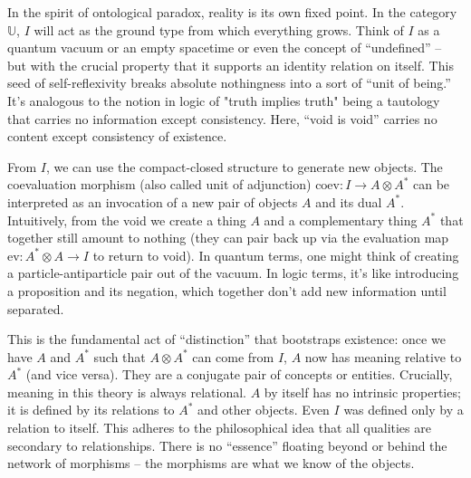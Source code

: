\documentclass{article}
\begin{document}
In the spirit of ontological paradox, reality is its own fixed point. In the category $\mathbb{U}$, $I$ will act as the ground type from which everything grows. Think of $I$ as a quantum vacuum or an empty spacetime or even the concept of “undefined” – but with the crucial property that it supports an identity relation on itself. This seed of self-reflexivity breaks absolute nothingness into a sort of “unit of being.” It’s analogous to the notion in logic of "truth implies truth" being a tautology that carries no information except consistency. Here, “void is void” carries no content except consistency of existence.

From $I$, we can use the compact-closed structure to generate new objects. The coevaluation morphism (also called unit of adjunction) $\text{coev}: I \to A \otimes A^*$ can be interpreted as an invocation of a new pair of objects $A$ and its dual $A^*$. Intuitively, from the void we create a thing $A$ and a complementary thing $A^*$ that together still amount to nothing (they can pair back up via the evaluation map $\text{ev}: A^* \otimes A \to I$ to return to void). In quantum terms, one might think of creating a particle-antiparticle pair out of the vacuum. In logic terms, it’s like introducing a proposition and its negation, which together don’t add new information until separated.\

This is the fundamental act of “distinction” that bootstraps existence: once we have $A$ and $A^*$ such that $A \otimes A^*$ can come from $I$, $A$ now has meaning relative to $A^*$ (and vice versa). They are a conjugate pair of concepts or entities. Crucially, meaning in this theory is always relational. $A$ by itself has no intrinsic properties; it is defined by its relations to $A^*$ and other objects. Even $I$ was defined only by a relation to itself. This adheres to the philosophical idea that all qualities are secondary to relationships. There is no “essence” floating beyond or behind the network of morphisms – the morphisms are what we know of the objects.
\end{document}

